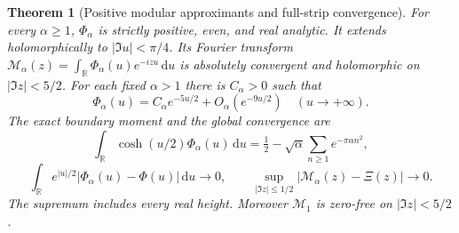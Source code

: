 \documentclass[11pt]{article}
\newtheorem{theorem}{Theorem}
\theoremstyle{remark}\newtheorem{remark}[theorem]{Remark}
\newcommand{\R}{\mathbb R}
\newcommand{\dd}{\,\mathrm d}
\begin{document}
\begin{theorem}[Positive modular approximants and full-strip convergence]
\label{thm:mehler-approximation}
For every $\alpha\ge1$, $\Phi_\alpha$ is strictly positive, even, and
real analytic. It extends holomorphically to $|\Im u|<\pi/4$.
Its Fourier transform
$\mathcal M_\alpha(z)=\int_\R\Phi_\alpha(u)e^{-izu}\dd u$
is absolutely convergent and holomorphic on $|\Im z|<5/2$.
For each fixed $\alpha>1$ there is $C_\alpha>0$ such that
\[
 \Phi_\alpha(u)=C_\alpha e^{-5u/2}
                              +O_\alpha(e^{-9u/2})\quad(u\to+\infty).
\]
The exact boundary moment and the global convergence are
\[
 \int_\R\cosh(u/2)\Phi_\alpha(u)\dd u
 =\tfrac12-\sqrt\alpha\sum_{n\ge1}e^{-\pi\alpha n^2},
\]
\[
 \int_\R e^{|u|/2}|\Phi_\alpha(u)-\Phi(u)|\dd u\longrightarrow0,
 \qquad
 \sup_{|\Im z|\le1/2}|\mathcal M_\alpha(z)-\Xi(z)|
                                                    \longrightarrow0.
 \tag{MCV}
\]
The supremum includes every real height. Moreover
$\mathcal M_1$ is zero-free on $|\Im z|<5/2$.
\end{theorem}
\end{document}
